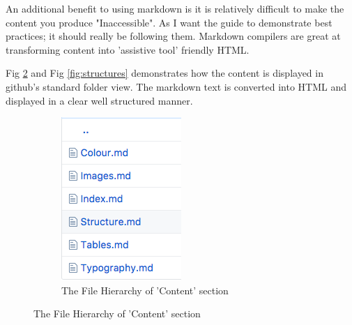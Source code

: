 An additional benefit to using markdown is it is relatively difficult to make
the content you produce "Inaccessible". As I want the guide to demonstrate
best practices; it should really be following them. Markdown compilers are
great at transforming content into 'assistive tool' friendly HTML.

Fig \ref{fig:hierarchy} and Fig \ref{fig:structures} demonstrates how the
content is displayed in github's standard folder view. The markdown text is
converted into HTML and displayed in a clear well structured manner.

\begin{figure}[H]
    \centering
    \begin{subfigure}[b]{0.25\textwidth}
        \includegraphics[width=\textwidth]{figures/documentation_md_example_1}
        \captionsetup{justification=centering}
        \caption{The File Hierarchy of 'Content' section}
        \label{fig:hierarchy}
    \end{subfigure}

\end{figure}
